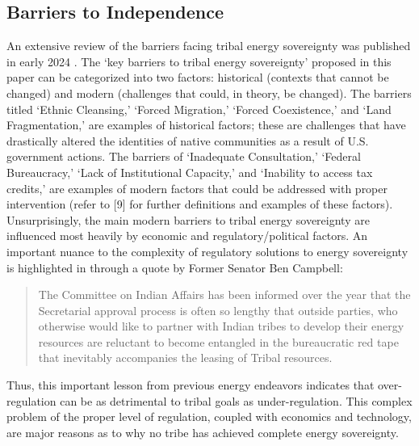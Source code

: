 \documentclass{anstrans}
\begin{document}
\subsection{Barriers to Independence}
An extensive review of the barriers facing tribal energy sovereignty was
published in early 2024 \cite{raimi_securing_2024}. The `key barriers to tribal
energy sovereignty' proposed in this paper can be categorized into two factors:
historical (contexts that cannot be changed) and modern (challenges that could,
in theory, be changed). The barriers titled `Ethnic Cleansing,' `Forced
Migration,' `Forced Coexistence,' and `Land Fragmentation,' are examples of
historical factors; these are challenges that have drastically altered the
identities of native communities as a result of U.S. government actions. The
barriers of `Inadequate Consultation,' `Federal Bureaucracy,' `Lack of
Institutional Capacity,' and `Inability to access tax credits,' are examples of
modern factors that could be addressed with proper intervention (refer to [9]
for further definitions and examples of these factors). Unsurprisingly, the main
modern barriers to tribal energy sovereignty are influenced most heavily by
economic and regulatory/political factors. An important nuance to the complexity
of regulatory solutions to energy sovereignty is highlighted in \cite{kronk2012}
through a quote by Former Senator Ben Campbell: 
\begin{quote}
  The Committee on Indian Affairs has been informed over the year that the
  Secretarial approval process is often so lengthy that outside parties, who
  otherwise would like to partner with Indian tribes to develop their energy
  resources are reluctant to become entangled in the bureaucratic red tape that
  inevitably accompanies the leasing of Tribal resources.
\end{quote}
Thus, this important lesson from previous energy endeavors indicates that
over-regulation can be as detrimental to tribal goals as under-regulation. This
complex problem of the proper level of regulation, coupled with economics and
technology, are major reasons as to why no tribe has achieved complete energy
sovereignty.

\end{document}
